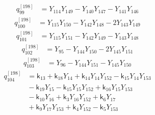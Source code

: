 \begin{equation}\label{q198:row:099}
\begin{aligned}
q_{99}^{[198]} &={} Y_{114}Y_{149} - Y_{140}Y_{147} - Y_{141}Y_{146}
\end{aligned}
\end{equation}
\begin{equation}\label{q198:row:100}
\begin{aligned}
q_{100}^{[198]} &={} Y_{115}Y_{150} - Y_{142}Y_{148} - 2Y_{143}Y_{149}
\end{aligned}
\end{equation}
\begin{equation}\label{q198:row:101}
\begin{aligned}
q_{101}^{[198]} &={} Y_{115}Y_{151} - Y_{142}Y_{149} - Y_{143}Y_{148}
\end{aligned}
\end{equation}
\begin{equation}\label{q198:row:102}
\begin{aligned}
q_{102}^{[198]} &={} Y_{95} - Y_{144}Y_{150} - 2Y_{145}Y_{151}
\end{aligned}
\end{equation}
\begin{equation}\label{q198:row:103}
\begin{aligned}
q_{103}^{[198]} &={} Y_{96} - Y_{144}Y_{151} - Y_{145}Y_{150}
\end{aligned}
\end{equation}
\begin{equation}\label{q198:row:104}
\begin{aligned}
q_{104}^{[198]} &={} \mathsf{k}_{13} + \mathsf{k}_{18}Y_{14} + \mathsf{k}_{14}Y_{14}Y_{152} - \mathsf{k}_{15}Y_{14}Y_{153}\\
&{} - \mathsf{k}_{19}Y_{15} - \mathsf{k}_{15}Y_{15}Y_{152} + \mathsf{k}_{16}Y_{15}Y_{153}\\
&{} - \mathsf{k}_{10}Y_{16} + \mathsf{k}_{3}Y_{16}Y_{152} + \mathsf{k}_{6}Y_{17}\\
&{} + \mathsf{k}_{9}Y_{17}Y_{153} + \mathsf{k}_{4}Y_{152} - \mathsf{k}_{5}Y_{153}
\end{aligned}
\end{equation}
